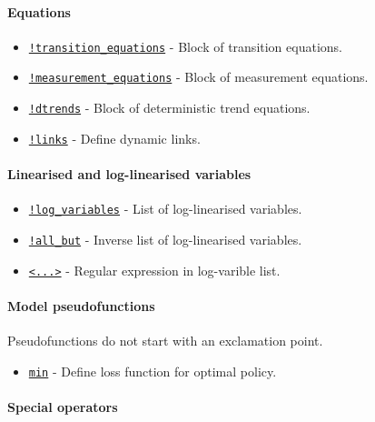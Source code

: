 \paragraph{Equations}

\begin{itemize}
\itemsep1pt\parskip0pt
\item
  \href{modellang/transitionequations}{\texttt{!transition\_equations}}
  - Block of transition equations.
\item
  \href{modellang/measurementequations}{\texttt{!measurement\_equations}}
  - Block of measurement equations.
\item
  \href{modellang/dtrends}{\texttt{!dtrends}} - Block of deterministic
  trend equations.
\item
  \href{modellang/links}{\texttt{!links}} - Define dynamic links.
\end{itemize}

\paragraph{Linearised and log-linearised
variables}

\begin{itemize}
\itemsep1pt\parskip0pt
\item
  \href{modellang/logvariables}{\texttt{!log\_variables}} - List of
  log-linearised variables.
\item
  \href{modellang/allbut}{\texttt{!all\_but}} - Inverse list of
  log-linearised variables.
\item
  \href{modellang/regexpression}{\texttt{\textless{}...\textgreater{}}}
  - Regular expression in log-varible list.
\end{itemize}

\paragraph{Model pseudofunctions}

Pseudofunctions do not start with an exclamation point.

\begin{itemize}
\itemsep1pt\parskip0pt
\item
  \href{modellang/min}{\texttt{min}} - Define loss function for optimal
  policy.
\end{itemize}

\paragraph{Special operators}

